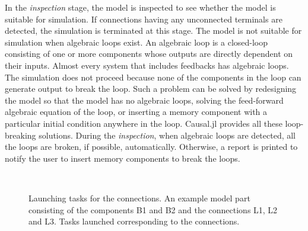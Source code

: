 In the \textit{inspection} stage, the model is inspected to see whether the model is suitable for simulation. If connections having any unconnected terminals are detected, the simulation is terminated at this stage. The model is not suitable for simulation when algebraic loops exist\cite{lamego2001adaptive}. An algebraic loop is a closed-loop consisting of one or more components whose outputs are directly dependent on their inputs. Almost every system that includes feedbacks has algebraic loops. The simulation does not proceed because none of the components in the loop can generate output to break the loop. Such a problem can be solved by redesigning the model so that the model has no algebraic loops, solving the feed-forward algebraic equation of the loop, or inserting a memory component with a particular initial condition anywhere in the loop. Causal.jl provides all these loop-breaking solutions. During the \textit{inspection}, when algebraic loops are detected, all the loops are broken, if possible, automatically. Otherwise, a report is printed to notify the user to insert memory components to break the loops.

\begin{figure}
    \centering
     \\
    \caption{Launching tasks for the connections. \protect{} An example model part consisting of the components B1 and B2 and the connections L1, L2 and L3. \protect{} Tasks launched corresponding to the connections.}
    \label{fig: tasks for components}
\end{figure}

